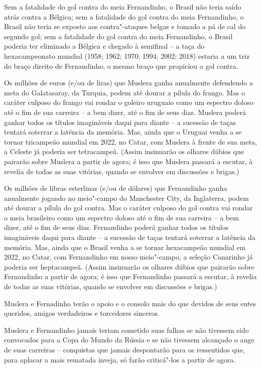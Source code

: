 Sem a fatalidade do gol contra do meia Fernandinho, o Brasil não teria
saído atrás contra a Bélgica; sem a fatalidade do gol contra do meia
Fernandinho, o Brasil não teria se exposto aos contra"-ataques belgas e
tomado a pá de cal do segundo gol; sem a fatalidade do gol contra do
meia Fernandinho, o Brasil poderia ter eliminado a Bélgica e chegado à
semifinal -- a taça do hexacampeonato mundial (1958; 1962; 1970; 1994;
2002; 2018) estaria a um triz do braço direito de Fernandinho, o mesmo
braço que propiciou o gol contra.

Os milhões de euros (e/ou de liras) que Muslera ganha anualmente
defendendo a meta do Galatasaray, da Turquia, podem até dourar a pílula
do frango. Mas o caráter culposo do frango vai rondar o goleiro uruguaio
como um espectro doloso até o fim de sua carreira -- a bem dizer, até o
fim de seus dias. Muslera poderá ganhar todos os títulos imagináveis
daqui para diante -- a sucessão de taças tentará soterrar a latência da
memória. Mas, ainda que o Uruguai venha a se tornar tricampeão mundial
em 2022, no Catar, com Muslera à frente de sua meta, a Celeste já
poderia ser tetracampeã. (Assim insinuarão os olhares dúbios que
pairarão sobre Muslera a partir de agora; é isso que Muslera passará a
escutar, à revelia de todas as suas vitórias, quando se envolver em
discussões e brigas.)

Os milhões de libras esterlinas (e/ou de dólares) que Fernandinho ganha
anualmente jogando no meio"-campo do Manchester City, da Inglaterra,
podem até dourar a pílula do gol contra. Mas o caráter culposo do gol
contra vai rondar o meia brasileiro como um espectro doloso até o fim de
sua carreira -- a bem dizer, até o fim de seus dias. Fernandinho poderá
ganhar todos os títulos imagináveis daqui para diante -- a sucessão de
taças tentará soterrar a latência da memória. Mas, ainda que o Brasil
venha a se tornar hexacampeão mundial em 2022, no Catar, com Fernandinho
em nosso meio"-campo, a seleção Canarinho já poderia ser heptacampeã.
(Assim insinuarão os olhares dúbios que pairarão sobre Fernandinho a
partir de agora; é isso que Fernandinho passará a escutar, à revelia de
todas as suas vitórias, quando se envolver em discussões e brigas.)

Muslera e Fernadinho terão o apoio e o consolo mais do que devidos de
seus entes queridos, amigos verdadeiros e torcedores sinceros.

Muslera e Fernandinho jamais teriam cometido suas falhas se não tivessem
sido convocados para a Copa do Mundo da Rússia e se não tivessem
alcançado o auge de suas carreiras -- conquistas que jamais despontarão
para os ressentidos que, para aplacar a mais rematada inveja, só farão
criticá"-los a partir de agora.

